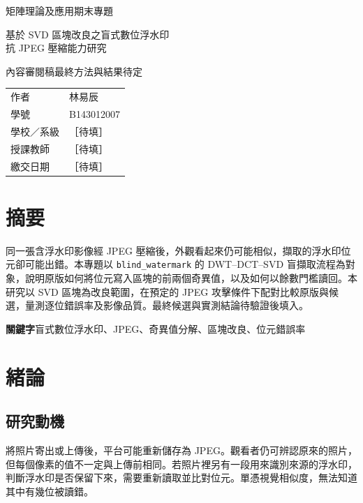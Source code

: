 \documentclass[12pt,a4paper,onecolumn]{article}
\renewcommand{\normalsize}{\fontsize{12bp}{19bp}\selectfont}
\begin{document}
\normalsize
\begin{titlepage}
\centering
\vspace*{15mm}
{\Large 矩陣理論及應用\quad 期末專題\par}
\vspace{10mm}
{\LARGE 基於 SVD 區塊改良之盲式數位浮水印\\[3mm]抗 JPEG 壓縮能力研究\par}
\vspace{8mm}
{\large 內容審閱稿\quad 最終方法與結果待定\par}
\vspace{8mm}
\begin{tabular}{ll}
作者 & 林易辰\\
學號 & B143012007\\
學校／系級 & ［待填］\\
授課教師 & ［待填］\\
繳交日期 & ［待填］
\end{tabular}

\vspace{10mm}
\begin{minipage}{0.91\textwidth}
\section*{摘要}
同一張含浮水印影像經 JPEG 壓縮後，外觀看起來仍可能相似，擷取的浮水印位元卻可能出錯。本專題以 \texttt{blind\_watermark} 的 DWT–DCT–SVD 盲擷取流程為對象，說明原版如何將位元寫入區塊的前兩個奇異值，以及如何以餘數門檻讀回。本研究以 SVD 區塊為改良範圍，在預定的 JPEG 攻擊條件下配對比較原版與候選，量測逐位錯誤率及影像品質。最終候選與實測結論待驗證後填入。

\noindent\textbf{關鍵字}\quad 盲式數位浮水印、JPEG、奇異值分解、區塊改良、位元錯誤率
\end{minipage}
\end{titlepage}
\setcounter{page}{2}

\section{緒論}

\subsection{研究動機}
將照片寄出或上傳後，平台可能重新儲存為 JPEG。觀看者仍可辨認原來的照片，但每個像素的值不一定與上傳前相同。若照片裡另有一段用來識別來源的浮水印，判斷浮水印是否保留下來，需要重新讀取並比對位元。單憑視覺相似度，無法知道其中有幾位被讀錯。
\end{document}
